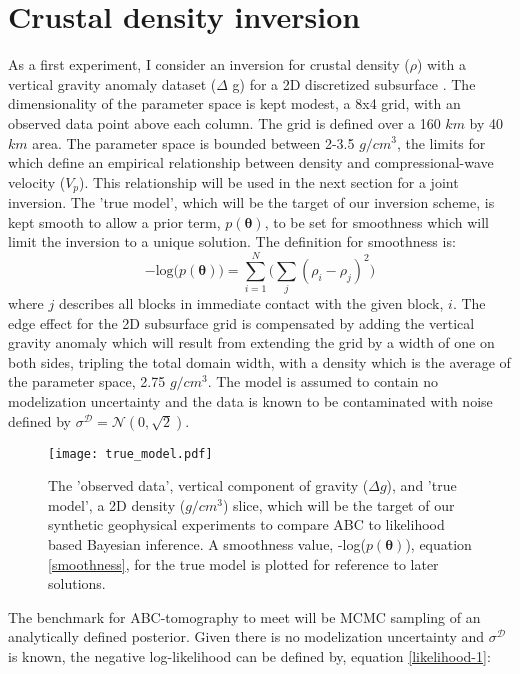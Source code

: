 \section{Crustal density inversion}

As a first experiment, I consider an inversion for crustal density ($\rho$) with a vertical gravity anomaly dataset ($\Delta$ g) for a 2D discretized subsurface \citep[p.184-195,378]{blakely1996}. The dimensionality of the parameter space is kept modest, a 8x4 grid, with an observed data point above each column. The grid is defined over a 160 $km$ by 40 $km$ area. The parameter space is bounded between 2-3.5 $g/cm^3$, the limits for which \citet{Brocher2005} define an empirical relationship between density and compressional-wave velocity ($V_p$). This relationship will be used in the next section for a joint inversion. The 'true model', which will be the target of our inversion scheme, is kept smooth to allow a prior term, $p(\bm{\theta})$, to be set for smoothness which will limit the inversion to a unique solution. The definition for smoothness is:
\begin{equation}
-\text{log}\big(p(\bm{\theta})\big) = \sum_{i = 1}^{N} \Big(\sum_{j} (\rho_i - \rho_j)^2\Big)
\label{smoothness}
\end{equation}
where $j$ describes all blocks in immediate contact with the given block, $i$. The edge effect for the 2D subsurface grid is compensated by adding the vertical gravity anomaly which will result from extending the grid by a width of one on both sides, tripling the total domain width, with a density which is the average of the parameter space, 2.75 $g/cm^3$. The model is assumed to contain no modelization uncertainty and the data is known to be contaminated with noise defined by $\sigma^{\mathcal{D}} = \mathcal{N}(0,\sqrt{2})$.
\begin{figure}[H]
	\centering
	\texttt{[image: true\_model.pdf]}
	\caption{The 'observed data', vertical component of gravity ($\Delta g$), and 'true model', a 2D density ($g/cm^3$) slice, which will be the target of our synthetic geophysical experiments to compare ABC to likelihood based Bayesian inference. A smoothness value, -log($p(\bm{\theta})$), equation \ref{smoothness}, for the true model is plotted for reference to later solutions.}
	\label{true_model}
\end{figure}
The benchmark for ABC-tomography to meet will be MCMC sampling of an analytically defined posterior. Given there is no modelization uncertainty and $\sigma^{\mathcal{D}}$ is known, the negative log-likelihood can be defined by, equation \ref{likelihood-1}:
